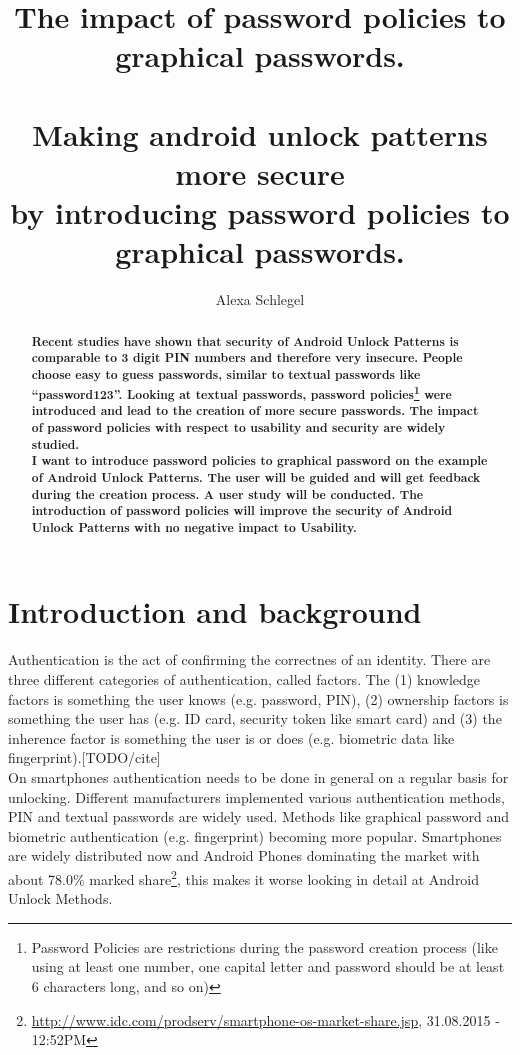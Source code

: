 \documentclass[twocolumn, a4paper, 10pt]{article}
\begin{document}
\title{
  The impact of password policies to graphical passwords.\\
  \\
  \large Making android unlock patterns more secure \\
  by introducing password policies to graphical passwords.}

\author{
	Alexa Schlegel
}

\maketitle

\def\abstractname{{\textbf Abstract}}
\begin{abstract}
{
\bfseries
Recent studies have shown that security of Android Unlock Patterns is comparable to 3 digit PIN numbers and therefore very insecure. People choose easy to guess passwords, similar to textual passwords like ``password123''. Looking at textual passwords, password policies\footnote{Password Policies are restrictions during the password creation process (like using at least one number, one capital letter and password should be at least 6 characters long, and so on)} were introduced and lead to the creation of more secure passwords. The impact of password policies with respect to usability and security are widely studied.\\

I want to introduce password policies to graphical password on the example of Android Unlock Patterns. The user will be guided and will get feedback during the creation process. A user study will be conducted. The introduction of password policies will improve the security of Android Unlock Patterns with no negative impact to Usability.
}
\end{abstract}


\section{Introduction and background}
Authentication is the act of confirming the correctnes of an identity. There are three different categories of authentication, called factors. The (1) knowledge factors is something the user knows (e.g. password, PIN), (2) ownership factors is something the user has (e.g. ID card, security token like smart card) and (3) the inherence factor is something the user is or does (e.g. biometric data like fingerprint).[TODO/cite]\\

On smartphones authentication needs to be done in general on a regular basis for unlocking. Different manufacturers implemented various authentication methods, PIN and textual passwords are widely used. Methods like graphical password and biometric authentication (e.g. fingerprint) becoming more popular. Smartphones are widely distributed now and Android Phones dominating the market with about 78.0\% marked share\footnote{\url{http://www.idc.com/prodserv/smartphone-os-market-share.jsp}, 31.08.2015 - 12:52PM}, this makes it worse looking in detail at Android Unlock Methods.\\
\end{document}
